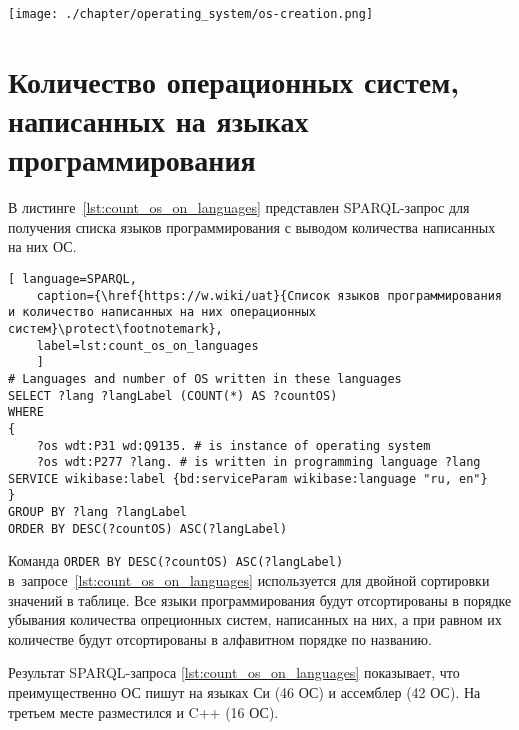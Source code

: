 \begin{figure*}[h!]
	\texttt{[image: ./chapter/operating\_system/os-creation.png]}
	\caption{Часть временной шкалы с датами выпуска операционных систем с~1955 по~2020 год. Шкала построена по запросу~\protect\ref{lst:inception_time_of_operating_systems}.}
	\label{fig:os_creation}
\end{figure*}



\section{Количество операционных систем, написанных на языках программирования}

В листинге~\ref{lst:count_os_on_languages} представлен SPARQL-запрос для получения списка языков программирования с выводом количества написанных на них ОС.


\marginnote[0.0cm]{
    \newline
    \newline
    \newline
    \newline
}
\begin{lstlisting}[ language=SPARQL, 
	caption={\href{https://w.wiki/uat}{Список языков программирования и количество написанных на них операционных систем}\protect\footnotemark},
	label=lst:count_os_on_languages
	]
# Languages and number of OS written in these languages
SELECT ?lang ?langLabel (COUNT(*) AS ?countOS)
WHERE 
{
	?os wdt:P31 wd:Q9135. # is instance of operating system
	?os wdt:P277 ?lang. # is written in programming language ?lang
SERVICE wikibase:label {bd:serviceParam wikibase:language "ru, en"}
}
GROUP BY ?lang ?langLabel
ORDER BY DESC(?countOS) ASC(?langLabel)
\end{lstlisting}

Команда \lstinline|ORDER BY DESC(?countOS) ASC(?langLabel)| в~запросе~\ref{lst:count_os_on_languages} используется для двойной сортировки значений в таблице. Все языки программирования будут отсортированы в порядке убывания количества опреционных систем, написанных на них, а при равном их количестве будут отсортированы в алфавитном порядке по названию.

Результат SPARQL-запроса \ref{lst:count_os_on_languages} показывает, что преимущественно ОС пишут на языках Си (46 ОС) и ассемблер (42 ОС). На третьем месте разместился и C++ (16 ОС).


